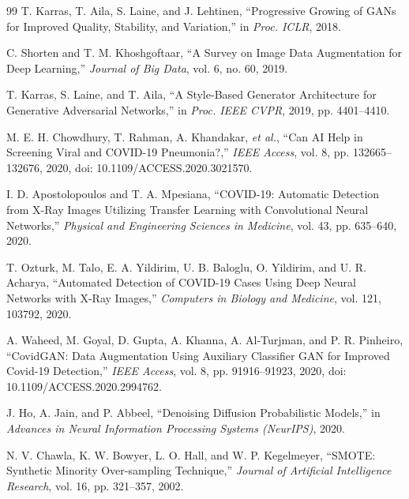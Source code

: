 \documentclass[conference]{IEEEtran}
\begin{document}
\begin{thebibliography}{99}
T. Karras, T. Aila, S. Laine, and J. Lehtinen, ``Progressive Growing of GANs for Improved Quality, Stability, and Variation,'' in \textit{Proc. ICLR}, 2018.

C. Shorten and T. M. Khoshgoftaar, ``A Survey on Image Data Augmentation for Deep Learning,'' \textit{Journal of Big Data}, vol. 6, no. 60, 2019.

T. Karras, S. Laine, and T. Aila, ``A Style-Based Generator Architecture for Generative Adversarial Networks,'' in \textit{Proc. IEEE CVPR}, 2019, pp. 4401--4410.

M. E. H. Chowdhury, T. Rahman, A. Khandakar, \textit{et al.}, ``Can AI Help in Screening Viral and COVID-19 Pneumonia?,'' \textit{IEEE Access}, vol. 8, pp. 132665--132676, 2020, doi: 10.1109/ACCESS.2020.3021570.

I. D. Apostolopoulos and T. A. Mpesiana, ``COVID-19: Automatic Detection from X-Ray Images Utilizing Transfer Learning with Convolutional Neural Networks,'' \textit{Physical and Engineering Sciences in Medicine}, vol. 43, pp. 635--640, 2020.

T. Ozturk, M. Talo, E. A. Yildirim, U. B. Baloglu, O. Yildirim, and U. R. Acharya, ``Automated Detection of COVID-19 Cases Using Deep Neural Networks with X-Ray Images,'' \textit{Computers in Biology and Medicine}, vol. 121, 103792, 2020.

A. Waheed, M. Goyal, D. Gupta, A. Khanna, A. Al-Turjman, and P. R. Pinheiro, ``CovidGAN: Data Augmentation Using Auxiliary Classifier GAN for Improved Covid-19 Detection,'' \textit{IEEE Access}, vol. 8, pp. 91916--91923, 2020, doi: 10.1109/ACCESS.2020.2994762.

J. Ho, A. Jain, and P. Abbeel, ``Denoising Diffusion Probabilistic Models,'' in \textit{Advances in Neural Information Processing Systems (NeurIPS)}, 2020.

N. V. Chawla, K. W. Bowyer, L. O. Hall, and W. P. Kegelmeyer, ``SMOTE: Synthetic Minority Over-sampling Technique,'' \textit{Journal of Artificial Intelligence Research}, vol. 16, pp. 321--357, 2002.

\end{thebibliography}
\end{document}

